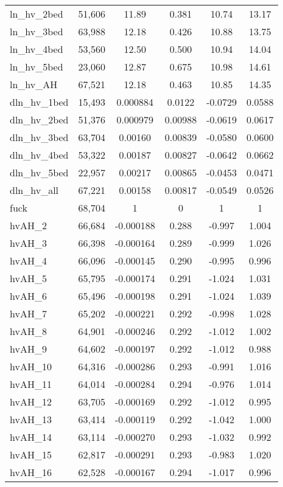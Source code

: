 \begin{tabular}{lccccc}
ln\_hv\_2bed & 51,606 & 11.89 & 0.381 & 10.74 & 13.17 \\
ln\_hv\_3bed & 63,988 & 12.18 & 0.426 & 10.88 & 13.75 \\
ln\_hv\_4bed & 53,560 & 12.50 & 0.500 & 10.94 & 14.04 \\
ln\_hv\_5bed & 23,060 & 12.87 & 0.675 & 10.98 & 14.61 \\
ln\_hv\_AH & 67,521 & 12.18 & 0.463 & 10.85 & 14.35 \\
dln\_hv\_1bed & 15,493 & 0.000884 & 0.0122 & -0.0729 & 0.0588 \\
dln\_hv\_2bed & 51,376 & 0.000979 & 0.00988 & -0.0619 & 0.0617 \\
dln\_hv\_3bed & 63,704 & 0.00160 & 0.00839 & -0.0580 & 0.0600 \\
dln\_hv\_4bed & 53,322 & 0.00187 & 0.00827 & -0.0642 & 0.0662 \\
dln\_hv\_5bed & 22,957 & 0.00217 & 0.00865 & -0.0453 & 0.0471 \\
dln\_hv\_all & 67,221 & 0.00158 & 0.00817 & -0.0549 & 0.0526 \\
fuck & 68,704 & 1 & 0 & 1 & 1 \\
hvAH\_2 & 66,684 & -0.000188 & 0.288 & -0.997 & 1.004 \\
hvAH\_3 & 66,398 & -0.000164 & 0.289 & -0.999 & 1.026 \\
hvAH\_4 & 66,096 & -0.000145 & 0.290 & -0.995 & 0.996 \\
hvAH\_5 & 65,795 & -0.000174 & 0.291 & -1.024 & 1.031 \\
hvAH\_6 & 65,496 & -0.000198 & 0.291 & -1.024 & 1.039 \\
hvAH\_7 & 65,202 & -0.000221 & 0.292 & -0.998 & 1.028 \\
hvAH\_8 & 64,901 & -0.000246 & 0.292 & -1.012 & 1.002 \\
hvAH\_9 & 64,602 & -0.000197 & 0.292 & -1.012 & 0.988 \\
hvAH\_10 & 64,316 & -0.000286 & 0.293 & -0.991 & 1.016 \\
hvAH\_11 & 64,014 & -0.000284 & 0.294 & -0.976 & 1.014 \\
hvAH\_12 & 63,705 & -0.000169 & 0.292 & -1.012 & 0.995 \\
hvAH\_13 & 63,414 & -0.000119 & 0.292 & -1.042 & 1.000 \\
hvAH\_14 & 63,114 & -0.000270 & 0.293 & -1.032 & 0.992 \\
hvAH\_15 & 62,817 & -0.000291 & 0.293 & -0.983 & 1.020 \\
hvAH\_16 & 62,528 & -0.000167 & 0.294 & -1.017 & 0.996 \\

\end{tabular}
